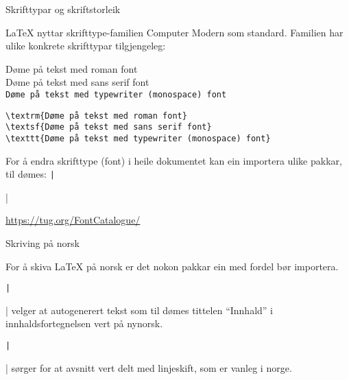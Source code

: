 	\begin{frame}[containsverbatim]{Skrifttypar og skriftstorleik}
	
\LaTeX{} nyttar skrifttype-familien Computer Modern som standard. Familien har ulike konkrete skrifttypar tilgjengeleg:
	
\textrm{Døme på tekst med roman font}\\
\textsf{Døme på tekst med sans serif font}\\
\texttt{Døme på tekst med typewriter (monospace) font}

	\begin{verbatim}
\textrm{Døme på tekst med roman font}
\textsf{Døme på tekst med sans serif font}
\texttt{Døme på tekst med typewriter (monospace) font}
	\end{verbatim}
	
	For å endra skrifttype (font) i heile dokumentet kan ein importera ulike pakkar, til dømes: \texttt|\usepackage{tgbonum}|
	
	\url{https://tug.org/FontCatalogue/}
	
	
\end{frame}

\begin{frame}{Skriving på norsk}
	
	For å skiva \LaTeX{} på norsk er det nokon pakkar ein med fordel bør importera.
	
	\texttt|\usepackage[nynorsk]{babel}| velger at autogenerert tekst som til dømes tittelen ``Innhald'' i innhaldsfortegnelsen vert på nynorsk.
	
	\texttt|\usepackage{parskip}| sørger for at avsnitt vert delt med linjeskift, som er vanleg i norge.
	
\end{frame}

